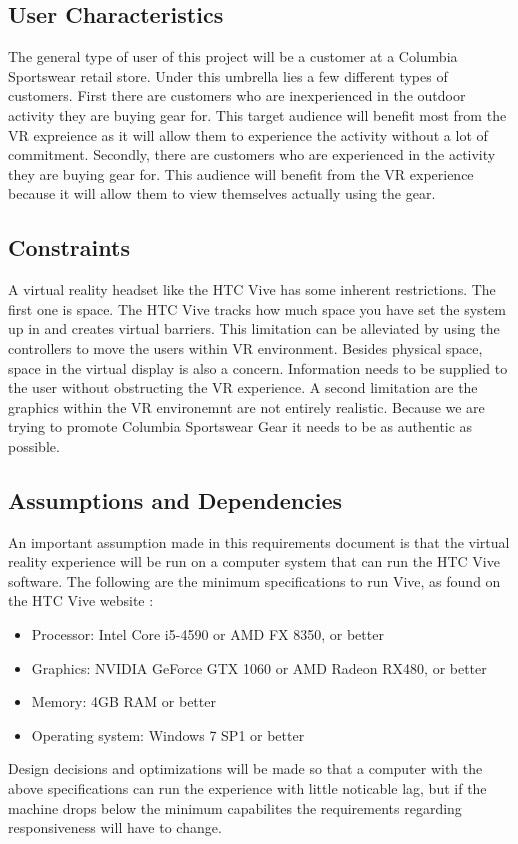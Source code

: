 \documentclass[10pt,journal,compsoc,onecolumn]{IEEEtran}
\begin{document}
\subsection{User Characteristics}
The general type of user of this project will be a customer at a Columbia
Sportswear retail store. Under this umbrella lies a few different types of
customers. First there are customers who are inexperienced in the outdoor
activity they are buying gear for. This target audience will benefit most
from the VR expreience as it will allow them to experience the activity without a lot of commitment.
Secondly, there are customers who are experienced in the activity they are
buying gear for. This audience will benefit from the VR experience because
it will allow them to view themselves actually using the gear.

\subsection{Constraints}
A virtual reality headset like the HTC Vive has some inherent restrictions.
The first one is space. The HTC Vive tracks how much space you have set the
system up in and creates virtual barriers. This limitation can be alleviated by
using the controllers to move the users within VR environment. Besides physical
space, space in the virtual display is also a concern. Information needs to be
supplied to the user without obstructing the VR experience. A second
limitation are the graphics within the VR environemnt are not entirely
realistic. Because we are trying to promote Columbia Sportswear Gear it needs
to be as authentic as possible.

\subsection{Assumptions and Dependencies}
An important assumption made in this requirements document is that the virtual
reality experience will be run on a computer system that can run the HTC Vive
software.  The following are the minimum specifications to run Vive, as found
on the HTC Vive website \cite{htc_vive_ready}:

\begin{itemize}
  \item Processor: Intel Core i5-4590 or AMD FX 8350, or better
  \item Graphics: NVIDIA GeForce GTX 1060 or AMD Radeon RX480, or better
  \item Memory: 4GB RAM or better
  \item Operating system: Windows 7 SP1 or better
\end{itemize}
Design decisions and optimizations will be made so that a computer with the
above specifications can run the experience with little noticable lag, but if
the machine drops below the minimum capabilites the requirements regarding
responsiveness will have to change.
\end{document}
